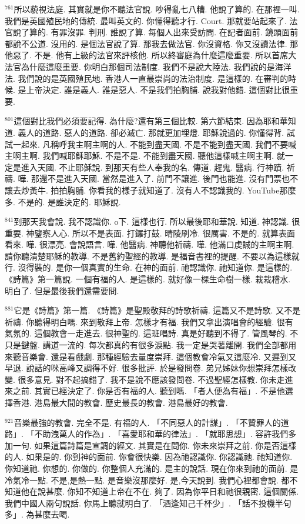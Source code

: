 \documentclass{book}
\begin{document}
$^{761}$所以藐視法庭.
其實就是你不聽法官說.
吵得亂七八糟.
他說了算的.
在那裡一叫.
我們是英國殖民地的傳統.
最叫英文的.
你懂得聽才行.
Court.
那就要站起來了.
法官說了算的.
有罪沒罪.
判刑.
誰說了算.
每個人出來受訪問.
在記者面前.
鏡頭面前都說不公道.
沒用的.
是個法官說了算.
那我去做法官.
你沒資格.
你又沒讀法律.
那他惡了.
不是.
他有上級的法官來評核他.
所以終審庭為什麼這麼重要.
所以首席大法官為什麼這麼重要.
你明白那個司法制度.
我們不是說大陸法.
我們說的是海洋法.
我們說的是英國殖民地.
香港人一直最崇尚的法治制度.
是這樣的.
在審判的時候.
是上帝決定.
誰是義人.
誰是惡人.
不是我們拍胸脯.
說我對他錯.
這個對比很重要.

$^{801}$這個對比我們必須要記得.
為什麼?還有第三個比較.
第六節結束.
因為耶和華知道.
義人的道路.
惡人的道路.
卻必滅亡.
那就更加埋燈.
耶穌說過的.
你懂得背.
試試一起來.
凡稱呼我主啊主啊的人.
不能到盡天國.
不是不能到盡天國.
我們不要喊主啊主啊.
我們喊耶穌耶穌.
不是不是.
不能到盡天國.
聽他這樣喊主啊主啊.
就一定是進入天國.
不止耶穌說.
到那天有些人奉我的名.
傳道.
趕鬼.
醫病.
行神蹟.
祈禱.
嘩.
那還不是進入天國.
當然是進入了.
前門不讓進.
後門也能進.
沒有門票也不讓去炒黃牛.
拍拍胸脯.
你看我的樣子就知道了.
沒有人不認識我的.
YouTube那麼多.
不是的.
是誰決定的.
耶穌說.

$^{841}$到那天我會說.
我不認識你.
o下.
這樣也行.
所以最後耶和華說.
知道.
神認識.
很重要.
神鑒察人心.
所以不是表面.
打鑼打鼓.
晴陵刷冷.
很厲害.
不是的.
就算表面看來.
嘩.
很漂亮.
會說語言.
嘩.
他醫病.
神聽他祈禱.
嘩.
他滿口虔誠的主啊主啊.
請你聽清楚耶穌的教導.
不是舊約聖經的教導.
是福音書裡的提醒.
不要以為這樣就行.
沒得裝的.
是你一個真實的生命.
在神的面前.
祂認識你.
祂知道你.
是這樣的.
《詩篇》第一篇說.
一個有福的人.
是這樣的.
就好像一棵生命樹一樣.
栽栽稽水.
明白了.
但是最後我們還需要問.

$^{881}$它是《詩篇》第一篇.
《詩篇》是聖殿敬拜的詩歌祈禱.
這篇又不是詩歌.
又不是祈禱.
你聽得明白嗎.
來到敬拜上帝.
怎樣才有福.
我們又拿出演唱會的經驗.
很有氣氛的.
這個教會一走進去.
很神聖的.
這班唱詩.
真是好聽到不得了.
管風琴的.
不只是鍵盤.
講道一流的.
每次都真的有很多淚點.
我一定是哭著離開.
我們全部都用來聽音樂會.
還是看戲劇.
那種經驗去量度崇拜.
這個教會冷氣又這麼冷.
又遲到又早退.
說話的咪高峰又調得不好.
很多批評.
於是發問卷.
弟兄姊妹你想崇拜怎樣改變.
很多意見.
對不起搞錯了.
我不是說不應該發問卷.
不過聖經怎樣教.
你未走進來之前.
其實已經決定了.
你是否有福的人.
聽到嗎.
「者人便為有福」.
不是他選擇香港.
港島最大間的教會.
歷史最長的教會.
港島最好的教會.

$^{921}$音樂最強的教會.
完全不是.
有福的人.
「不同惡人的計謀」.
「不贊罪人的道路」.
「不助洩萬人的作為」.
「喜愛耶和華的律法」.
「就耶思想」.
容許我們多加一句.
如果這篇詩篇是宣調的經文.
其實是在問你.
你未來崇拜之前.
你是否這樣的人.
如果是的.
你到神的面前.
你會很快樂.
因為祂認識你.
你認識祂.
祂知道你.
你知道祂.
你想的.
你做的.
你整個人充滿的.
是主的說話.
現在你來到祂的面前.
是冷氣冷一點.
不是,是熱一點.
是音樂沒那麼好.
是,今天說到.
我們心裡都會說.
都不知道他在說甚麼.
你知不知道上帝在不在.
夠了.
因為你平日和祂很親密.
這個關係.
我們中國人兩句說話.
你馬上聽就明白了.
「酒逢知己千杯少」.
「話不投機半句多」.
為甚麼去喝.
\end{document}
